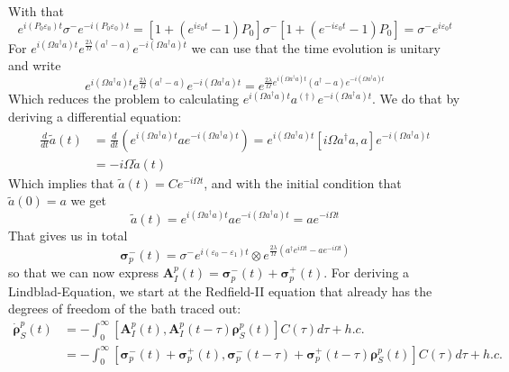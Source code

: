 	With that
	\begin{equation}
		e^{i (P_0 \varepsilon_0)t} \sigma^- e^{-i (P_0 \varepsilon_0)t} =		\left[1 + (e^{i\varepsilon_0 t} - 1) P_0\right] \sigma^- 	\left[1 + (e^{-i\varepsilon_0 t} - 1) P_0\right] =	\sigma^- e^{i\varepsilon_0t}
	\end{equation}
	For $e^{i (\Omega a^\dagger a)t}e^{\frac{2\lambda}{\Omega} (a^\dagger -a)}  e^{-i (\Omega a^\dagger a)t}$ we can use that the time evolution is unitary and write
	\begin{equation}
		e^{i (\Omega a^\dagger a)t}e^{\frac{2\lambda}{\Omega} (a^\dagger -a)}  e^{-i (\Omega a^\dagger a)t} =	e^{\frac{2\lambda}{\Omega} e^{i (\Omega a^\dagger a)t} (a^\dagger -a) e^{-i (\Omega a^\dagger a)t}}
	\end{equation}
	Which reduces the problem to calculating $e^{i (\Omega a^\dagger a)t} a^{(\dagger)} e^{-i (\Omega a^\dagger a)t}$. We do that by deriving a differential equation:
	\begin{align}
		\frac{d}{dt} \tilde{a}(t) &=	\frac{d}{dt} \left( e^{i (\Omega a^\dagger a)t} a e^{-i (\Omega a^\dagger a)t} \right) =	e^{i (\Omega a^\dagger a)t} \left[i\Omega a^\dagger a, a\right] e^{-i (\Omega a^\dagger a)t} \\
		&= - i \Omega \tilde{a}(t)
	\end{align}
	Which implies that $\tilde{a}(t) =	C e^{-i\Omega t}$, and with the initial condition that $\tilde{a}(0) = a$ we get
	\begin{equation}
		\tilde{a}(t) = e^{i (\Omega a^\dagger a)t} a e^{-i (\Omega a^\dagger a)t} =	a e^{-i\Omega t}
	\end{equation}
	That gives us in total
	\begin{equation}
		\boldsymbol{\sigma}_p^-(t) =	\sigma^- e^{i(\varepsilon_0 - \varepsilon_1) t}  \otimes e^{\frac{2\lambda}{\Omega} (a^\dagger e^{i \Omega t} -a e^{-i \Omega t})}
	\end{equation}
	so that we can now express $\mathbf{A}_I^p (t) =			\boldsymbol{\sigma}_p^-(t) + 		\boldsymbol{\sigma}_p^+(t)$. For deriving a Lindblad-Equation, we start at the Redfield-II equation that already has the degrees of freedom of the bath traced out:
	\begin{align}
		\dot{\boldsymbol{\rho}}_S^p(t) &=	- \int_{0}^{\infty} \left[\boldsymbol{A}_I^p (t), \boldsymbol{A}_I^p (t - \tau) \boldsymbol{\rho}_S^p(t)\right]C(\tau) d\tau + h.c. \\
		&= - \int_{0}^{\infty} \left[\boldsymbol{\sigma}_p^-(t) + 		\boldsymbol{\sigma}_p^+(t), \boldsymbol{\sigma}_p^-(t - \tau) + 		\boldsymbol{\sigma}_p^+(t - \tau) \boldsymbol{\rho}_S^p(t)\right]C(\tau) d\tau + h.c.
	\end{align}
